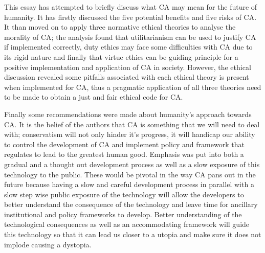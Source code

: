 This essay has attempted to briefly discuss what CA may mean for the future of humanity. It has firstly discussed the five potential benefits and five risks of CA. It than moved on to apply three normative ethical theories to analyse the morality of CA; the analysis found that utilitarianism can be used to justify CA if implemented correctly, duty ethics may face some difficulties with CA due to its rigid nature and finally that virtue ethics can be guiding principle for a positive implementation and application of CA in society. However, the ethical discussion revealed some pitfalls associated with each ethical theory is present when implemented for CA, thus a pragmatic application of all three theories need to be made to obtain a just and fair ethical code for CA.

Finally some recommendations were made about humanity's approach towards CA. It is the belief of the authors that CA is something that we will need to deal with; conservatism will not only hinder it's progress, it will handicap our ability to control the development of CA and implement policy and framework that regulates to lead to the greatest human good. Emphasis was put into both a gradual and a thought out development process as well as a slow exposure of this technology to the public. These would be pivotal in the way CA pans out in the future because having a slow and careful development process in parallel with a slow step wise public exposure of the technology will allow the developers to better understand the consequence of the technology and leave time for ancillary institutional and policy frameworks to develop. Better understanding of the technological consequences as well as an accommodating framework will guide this technology so that it can lead us closer to a utopia and make sure it does not implode causing a dystopia.